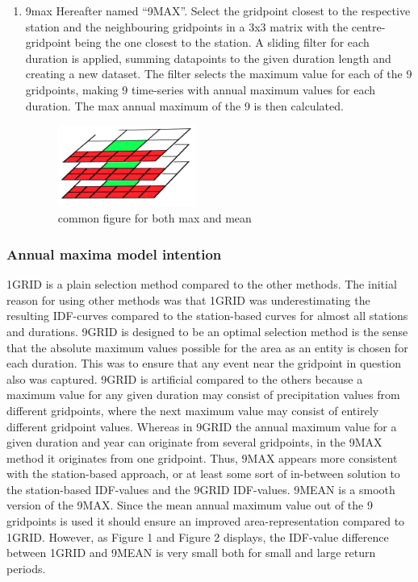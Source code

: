 \begin{enumerate}
\item 9max
Hereafter named “9MAX”. Select the gridpoint closest to the respective station and the neighbouring gridpoints in a 3x3 matrix with the centre-gridpoint being the one closest to the station. A sliding filter for each duration is applied, summing datapoints to the given duration length and creating a new dataset. The filter selects the maximum value for each of the 9 gridpoints, making 9 time-series with annual maximum values for each duration. The max annual maximum of the 9 is then calculated.

\begin{figure}[hbt!]
    \centering
    \includegraphics[width=4.5cm]{figures/met9max_mean.PNG}
    \caption{common figure for both max and mean}
    \label{fig:my_label}
\end{figure}

\end{enumerate}

\subsubsection{Annual maxima model intention}
1GRID is a plain selection method compared to the other methods. The initial reason for using other methods was that 1GRID was underestimating the resulting IDF-curves compared to the station-based curves for almost all stations and durations. 9GRID is designed to be an optimal selection method is the sense that the absolute maximum values possible for the area as an entity is chosen for each duration. This was to ensure that any event near the gridpoint in question also was captured. 9GRID is artificial compared to the others because a maximum value for any given duration may consist of precipitation values from different gridpoints, where the next maximum value may consist of entirely different gridpoint values. Whereas in 9GRID the annual maximum value for a given duration and year can originate from several gridpoints, in the 9MAX method it originates from one gridpoint. Thus, 9MAX appears more consistent with the station-based approach, or at least some sort of in-between solution to the station-based IDF-values and the 9GRID IDF-values. 9MEAN is a smooth version of the 9MAX. Since the mean annual maximum value out of the 9 gridpoints is used it should ensure an improved area-representation compared to 1GRID. However, as Figure 1 and Figure 2 displays, the IDF-value difference between 1GRID and 9MEAN is very small both for small and large return periods.    


